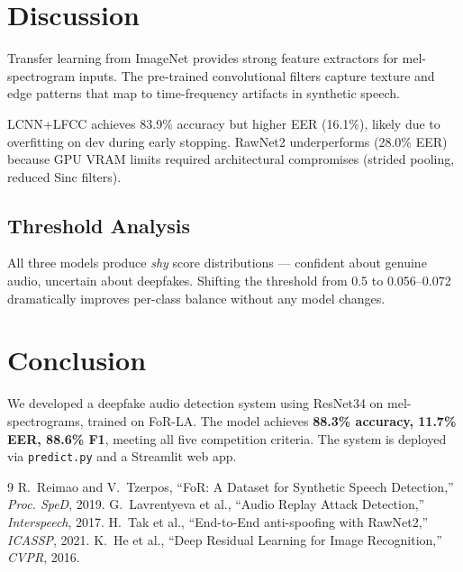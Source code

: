 \documentclass[12pt,a4paper]{article}
\begin{document}
\section{Discussion}

Transfer learning from ImageNet provides strong feature extractors for
mel-spectrogram inputs. The pre-trained convolutional filters capture texture
and edge patterns that map to time-frequency artifacts in synthetic speech.

LCNN+LFCC achieves 83.9\% accuracy but higher EER
(16.1\%), likely due to overfitting on dev during early stopping.
RawNet2 underperforms (28.0\% EER) because GPU VRAM limits
required architectural compromises (strided pooling, reduced Sinc filters).

\subsection{Threshold Analysis}

All three models produce \emph{shy} score distributions — confident about
genuine audio, uncertain about deepfakes. Shifting the threshold from 0.5 to
0.056--0.072 dramatically improves per-class balance without any model changes.

\section{Conclusion}

We developed a deepfake audio detection system using ResNet34 on
mel-spectrograms, trained on FoR-LA. The model achieves
\textbf{88.3\% accuracy, 11.7\% EER,
88.6\% F1}, meeting all five competition criteria.
The system is deployed via \texttt{predict.py} and a Streamlit web app.

\begin{thebibliography}{9}
 R.~Reimao and V.~Tzerpos, ``FoR: A Dataset for Synthetic
Speech Detection,'' \textit{Proc. SpeD}, 2019.
 G.~Lavrentyeva et al., ``Audio Replay Attack Detection,''
\textit{Interspeech}, 2017.
 H.~Tak et al., ``End-to-End anti-spoofing with RawNet2,''
\textit{ICASSP}, 2021.
 K.~He et al., ``Deep Residual Learning for Image
Recognition,'' \textit{CVPR}, 2016.
\end{thebibliography}
\end{document}
